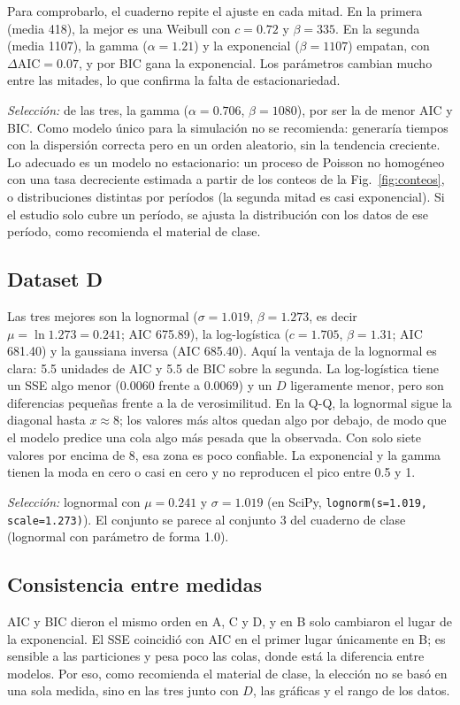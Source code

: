 \documentclass[conference]{IEEEtran}
\begin{document}
Para comprobarlo, el cuaderno repite el ajuste en cada mitad. En la primera (media 418), la mejor es una Weibull con $c=0.72$ y $\beta=335$. En la segunda (media 1107), la gamma ($\alpha=1.21$) y la exponencial ($\beta=1107$) empatan, con $\Delta\mathrm{AIC}=0.07$, y por BIC gana la exponencial. Los parámetros cambian mucho entre las mitades, lo que confirma la falta de estacionariedad.

\emph{Selección:} de las tres, la gamma ($\alpha=0.706$, $\beta=1080$), por ser la de menor AIC y BIC. Como modelo único para la simulación no se recomienda: generaría tiempos con la dispersión correcta pero en un orden aleatorio, sin la tendencia creciente. Lo adecuado es un modelo no estacionario: un proceso de Poisson no homogéneo con una tasa decreciente estimada a partir de los conteos de la Fig.~\ref{fig:conteos}, o distribuciones distintas por períodos (la segunda mitad es casi exponencial). Si el estudio solo cubre un período, se ajusta la distribución con los datos de ese período, como recomienda el material de clase.

\subsection{Dataset D}
Las tres mejores son la lognormal ($\sigma=1.019$, $\beta=1.273$, es decir $\mu=\ln1.273=0.241$; AIC 675.89), la log-logística ($c=1.705$, $\beta=1.31$; AIC 681.40) y la gaussiana inversa (AIC 685.40). Aquí la ventaja de la lognormal es clara: 5.5 unidades de AIC y 5.5 de BIC sobre la segunda. La log-logística tiene un SSE algo menor (0.0060 frente a 0.0069) y un $D$ ligeramente menor, pero son diferencias pequeñas frente a la de verosimilitud. En la Q-Q, la lognormal sigue la diagonal hasta $x\approx8$; los valores más altos quedan algo por debajo, de modo que el modelo predice una cola algo más pesada que la observada. Con solo siete valores por encima de 8, esa zona es poco confiable. La exponencial y la gamma tienen la moda en cero o casi en cero y no reproducen el pico entre 0.5 y 1.

\emph{Selección:} lognormal con $\mu=0.241$ y $\sigma=1.019$ (en SciPy, \texttt{lognorm(s=1.019, scale=1.273)}). El conjunto se parece al conjunto 3 del cuaderno de clase (lognormal con parámetro de forma 1.0).

\subsection{Consistencia entre medidas}
AIC y BIC dieron el mismo orden en A, C y D, y en B solo cambiaron el lugar de la exponencial. El SSE coincidió con AIC en el primer lugar únicamente en B; es sensible a las particiones y pesa poco las colas, donde está la diferencia entre modelos. Por eso, como recomienda el material de clase, la elección no se basó en una sola medida, sino en las tres junto con $D$, las gráficas y el rango de los datos.
\end{document}

